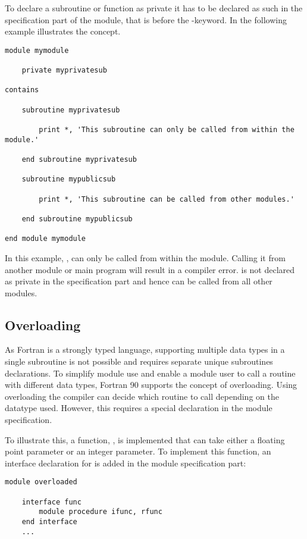 To declare a subroutine or function as private it has to be declared as such in the specification part of the module, that is before the -keyword. In the following example illustrates the concept.

\begin{lstlisting}
module mymodule

	private myprivatesub
	
contains

	subroutine myprivatesub
	
		print *, 'This subroutine can only be called from within the module.'
	
	end subroutine myprivatesub
	
	subroutine mypublicsub
	
		print *, 'This subroutine can be called from other modules.'
	
	end subroutine mypublicsub
	
end module mymodule
\end{lstlisting}

In this example, , can only be called from within the module. Calling it from another module or main program will result in a compiler error.  is not declared as private in the specification part and hence can be called from all other modules. 

\subsection{Overloading}

As Fortran is a strongly typed language, supporting multiple data types in a single subroutine is not possible and requires separate unique subroutines declarations. To simplify module use and enable a module user to call a routine with different data types, Fortran 90 supports the concept of overloading. Using overloading the compiler can decide which routine to call depending on the datatype used. However, this requires a special declaration in the module specification. 

To illustrate this, a function, , is implemented that can take either a floating point parameter or an integer parameter. To implement this function, an interface declaration for  is added in the module specification part:

\begin{lstlisting}
module overloaded

	interface func
		module procedure ifunc, rfunc
	end interface
	...
\end{lstlisting}

